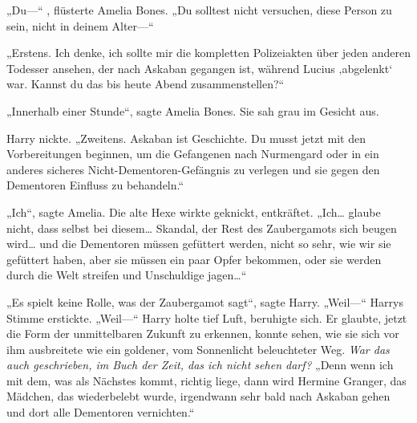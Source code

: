 „Du—“ , flüsterte Amelia Bones. „Du solltest nicht versuchen, diese Person zu sein, nicht in deinem Alter—“

„Erstens. Ich denke, ich sollte mir die kompletten Polizeiakten über jeden anderen Todesser ansehen, der nach Askaban gegangen ist, während Lucius ‚abgelenkt‘ war. Kannst du das bis heute Abend zusammenstellen?“

„Innerhalb einer Stunde“, sagte Amelia Bones. Sie sah grau im Gesicht aus.

Harry nickte.
„Zweitens. Askaban ist Geschichte. Du musst jetzt mit den Vorbereitungen beginnen, um die Gefangenen nach Nurmengard oder in ein anderes sicheres Nicht-Dementoren-Gefängnis zu verlegen und sie gegen den Dementoren Einfluss zu behandeln.“

„Ich“, sagte Amelia. Die alte Hexe wirkte geknickt, entkräftet. „Ich… glaube nicht, dass selbst bei diesem… Skandal, der Rest des Zaubergamots sich beugen wird… und die Dementoren müssen gefüttert werden, nicht so sehr, wie wir sie gefüttert haben, aber sie müssen ein paar Opfer bekommen, oder sie werden durch die Welt streifen und Unschuldige jagen…“

„Es spielt keine Rolle, was der Zaubergamot sagt“, sagte Harry. „Weil—“
Harrys Stimme erstickte.
„Weil—“
Harry holte tief Luft, beruhigte sich. Er glaubte, jetzt die Form der unmittelbaren Zukunft zu erkennen, konnte sehen, wie sie sich vor ihm ausbreitete wie ein goldener, vom Sonnenlicht beleuchteter Weg.
\emph{War das auch geschrieben, im Buch der Zeit, das ich nicht sehen darf?}
„Denn wenn ich mit dem, was als Nächstes kommt, richtig liege, dann wird Hermine Granger, das Mädchen, das wiederbelebt wurde, irgendwann sehr bald nach Askaban gehen und dort alle Dementoren vernichten.“

